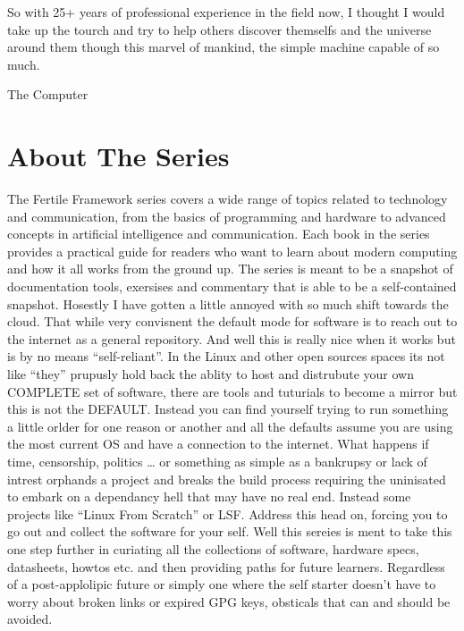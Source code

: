 So with 25+ years of professional experience in the field now, I thought I would take up the tourch and try to help others discover themselfs and the universe around them though this marvel of mankind, the simple machine capable of so much.

The Computer

\section*{About The Series}

The Fertile Framework series covers a wide range of topics related to technology and communication, from the basics of programming and hardware to advanced concepts in artificial intelligence and communication. Each book in the series provides a practical guide for readers who want to learn about modern computing and how it all works from the ground up. 
The series is meant to be a snapshot of documentation tools, exersises and commentary that is able to be a self-contained snapshot. Hosestly I have gotten a little annoyed with so much shift towards the cloud. That while very convisnent the default mode for software is to reach out to the internet as a general repository. And well this is really nice when it works but is by no means “self-reliant”. In the Linux and other open sources spaces its not like “they” prupusly hold back the ablity to host and distrubute your own COMPLETE set of software, there are tools and tuturials to become a mirror but this is not the DEFAULT. Instead you can find yourself trying to run something a little orlder for one reason or another and all the defaults assume you are using the most current OS and have a connection to the internet. 
What happens if time, censorship, politics … or something as simple as a bankrupsy or lack of intrest orphands a project and breaks the build process requiring the uninisated to embark on a dependancy hell that may have no real end. Instead some projects like “Linux From Scratch” or LSF. Address this head on, forcing you to go out and collect the software for your self. Well this sereies is ment to take this one step further in curiating all the collections of software, hardware specs, datasheets, howtos etc. and then providing paths for future learners. Regardless of a post-applolipic future or simply one where the self starter doesn’t have to worry about broken links or expired GPG keys, obsticals that can and should be avoided. 
